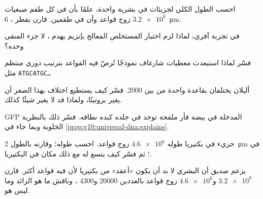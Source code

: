 \begin{exercise}[$\star\star$]\label{exo:g10:universal-dna:7}
احسب الطول الكلي لجزيئات  في  بشرية واحدة، علمًا بأن في كل طقم
صبغيات $\num{3.2e9}$ زوج قواعد وأن في  طقمين. قارن بقطر ،
\qty{6}{\micro m}.
\end{exercise}

\begin{exercise}[$\star\star$]\label{exo:g10:universal-dna:8}
في تجربة آفري، لماذا لزم اختبار المستخلص المعالج بإنزيم يهدم ، لا
جزء  المنقى وحده؟
\end{exercise}

\begin{exercise}[$\star\star$]\label{exo:g10:universal-dna:9}
فسّر لماذا استبعدت معطيات شارغاف نموذجًا تُرصّ فيه القواعد بترتيب
دوري منتظم مثل \texttt{ATGCATGC\dots}
\end{exercise}

\begin{exercise}[$\star\star$]\label{exo:g10:universal-dna:10}
أليلان  يختلفان بقاعدة واحدة من بين 2000. فسّر كيف يستطيع
اختلاف بهذا الصغر أن يغير بروتينًا، ولماذا قد لا يغير شيئًا كذلك.
\end{exercise}

\begin{exercise}[$\star\star$]\label{exo:g10:universal-dna:11}
 GFP المدخلة في بيضة فأر ملقحة توجد في  جلده  كبده
 نطافه. فسّر ذلك بالنظرية الخلوية وبما
جاء في \cref{prop:g10:universal-dna:explains}.
\end{exercise}

\begin{exercise}[$\star\star\star$]\label{exo:g10:universal-dna:12}
جزيء  في بكتيريا طوله $\num{4.6e6}$ زوج قواعد. احسب طوله؛ وقارنه
بالطول \qty{2}{\micro m} في ؛ ثم فسّر كيف يتسع له مع ذلك مكان في
البكتيريا.
\end{exercise}

\begin{exercise}[$\star\star\star$]\label{exo:g10:universal-dna:13}
يزعم صديق أن  البشري لا بد أن يكون «أعقد» من  بكتيريا لأن فيه
قواعد أكثر. قارن $\num{3.2e9}$ و$\num{4.6e6}$ زوج قواعد
بالعددين $\num{20000}$ و4300 ، وناقش ما هو  الزائد وما ليس هو.
\end{exercise}

